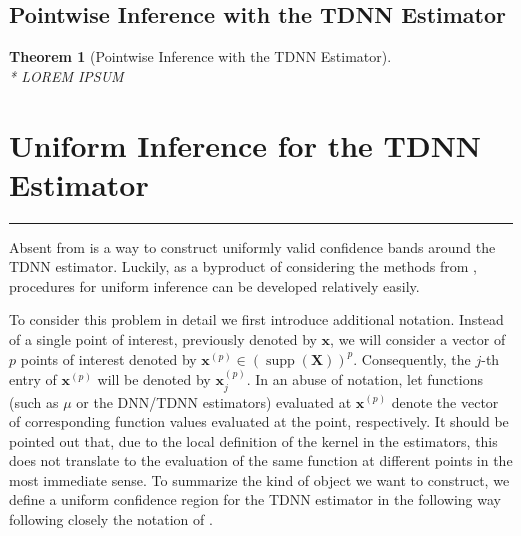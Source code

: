 \documentclass[letterpaper,10pt]{article}
\numberwithin{equation}{section}
\newtheorem{thm}{Theorem}
\numberwithin{thm}{section}
\numberwithin{lem}{section}
\numberwithin{cor}{section}
\renewcommand{\hat}{\widehat}
\newcommand{\1}{\mathbbm{1}}
\begin{document}
\subsection{Pointwise Inference with the TDNN Estimator}

{\color{red}
	\begin{thm}[Pointwise Inference with the TDNN Estimator]\label{sec:pw_inf_TDNN}\mbox{}\\*
		LOREM IPSUM
	\end{thm}
}

\newpage
\section{Uniform Inference for the TDNN Estimator}\label{unif_inf}
\hrule
Absent from \citet{demirkaya_optimal_2024} is a way to construct uniformly valid confidence bands around the TDNN estimator.
Luckily, as a byproduct of considering the methods from \citet{ritzwoller_uniform_2024}, procedures for uniform inference can be developed relatively easily.

To consider this problem in detail we first introduce additional notation.
Instead of a single point of interest, previously denoted by $\mathbf{x}$, we will consider a vector of $p$ points of interest denoted by $\mathbf{x}^{(p)} \in \left(\operatorname{supp}\left(\mathbf{X}\right)\right)^{p}$.
Consequently, the $j$-th entry of $\mathbf{x}^{(p)}$ will be denoted by $\mathbf{x}^{(p)}_{j}$.
In an abuse of notation, let functions (such as $\mu$ or the DNN/TDNN estimators) evaluated at $\mathbf{x}^{(p)}$ denote the vector of corresponding function values evaluated at the point, respectively.
It should be pointed out that, due to the local definition of the kernel in the estimators, this does not translate to the evaluation of the same function at different points in the most immediate sense.
To summarize the kind of object we want to construct, we define a uniform confidence region for the TDNN estimator in the following way following closely the notation of \citet{ritzwoller_uniform_2024}.
\end{document}

